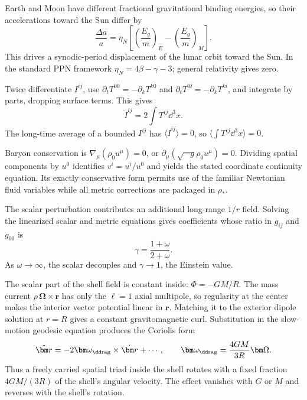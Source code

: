 \begin{solutions}
\begin{solution}
Earth and Moon have different fractional gravitational binding energies, so
their accelerations toward the Sun differ by
\[
\frac{\Delta a}{a}
=\eta_N\left[
\left(\frac{E_g}{m}\right)_{\!E}
-\left(\frac{E_g}{m}\right)_{\!M}\right].
\]
This drives a synodic-period displacement of the lunar orbit toward the Sun.
In the standard PPN framework
\(\eta_N=4\beta-\gamma-3\); general relativity gives zero.
\end{solution}

\begin{solution}
Twice differentiate \(I^{ij}\), use
\(\partial_tT^{00}=-\partial_kT^{k0}\) and
\(\partial_tT^{0\ii}=-\partial_kT^{ki}\), and integrate by parts, dropping
surface terms.  This gives
\[
\ddot I^{ij}=2\int T^{ij}\dd^3x.
\]
The long-time average of a bounded \(I^{ij}\) has
\(\langle\ddot I^{ij}\rangle=0\), so
\(\langle\int T^{ij}\dd^3x\rangle=0\).
\end{solution}

\begin{solution}
Baryon conservation is
\(\nabla_\mu(\rho_0u^\mu)=0\), or
\(\partial_\mu(\sqrt{-g}\rho_0u^\mu)=0\).  Dividing spatial components by
\(u^0\) identifies \(v^i=u^i/u^0\) and yields the stated coordinate
continuity equation.  Its exactly conservative form permits use of the
familiar Newtonian fluid variables while all metric corrections are packaged
in \(\rho_\ast\).
\end{solution}

\begin{solution}
The scalar perturbation contributes an additional long-range \(1/r\) field.
Solving the linearized scalar and metric equations gives coefficients whose
ratio in \(g_{ij}\) and \(g_{00}\) is
\[
\gamma=\frac{1+\omega}{2+\omega}.
\]
As \(\omega\to\infty\), the scalar decouples and \(\gamma\to1\), the Einstein
value.
\end{solution}

\begin{solution}
The scalar part of the shell field is constant inside:
\(\Phi=-GM/R\).  The mass current
\(\rho\,\bm\Omega\times\bm r\) has only the \(\ell=1\) axial multipole, so
regularity at the center makes the interior vector potential linear in
\(\bm r\).  Matching it to the exterior dipole solution at \(r=R\) gives a
constant gravitomagnetic curl.  Substitution in the slow-motion geodesic
equation produces the Coriolis form
\[
\ddot{\bm r}=-2\bm\omega_{\rm \dd rag}\times\dot{\bm r}+\cdots,
\qquad
\bm\omega_{\rm \dd rag}=\frac{4GM}{3R}\bm\Omega.
\]
Thus a freely carried spatial triad inside the shell rotates with a fixed
fraction \(4GM/(3R)\) of the shell's angular velocity.  The effect vanishes
with \(G\) or \(M\) and reverses with the shell's rotation.
\end{solution}



\end{solutions}
